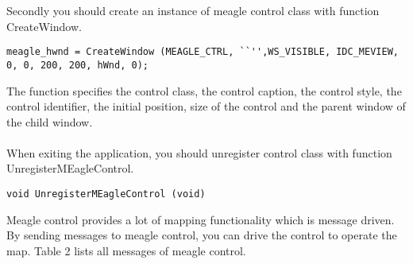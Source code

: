 \documentclass[a4paper]{article}
\begin{document}
Secondly you should create an instance of meagle control class with function CreateWindow.
\begin{lstlisting}
meagle_hwnd = CreateWindow (MEAGLE_CTRL, ``'',WS_VISIBLE, IDC_MEVIEW, 0, 0, 200, 200, hWnd, 0);  
\end{lstlisting}
The function specifies the control class, the control caption, the control style, the control identifier, the initial position, size of the control and the parent window of the child window. \\ \\
When exiting the application, you should unregister control class with function UnregisterMEagleControl.
\begin{lstlisting}
void UnregisterMEagleControl (void)
\end{lstlisting}  
Meagle control provides a lot of mapping functionality which  is message driven. By sending messages to meagle control,  you can drive the control to operate the map. Table 2 lists all messages of meagle control. 
\end{document}
